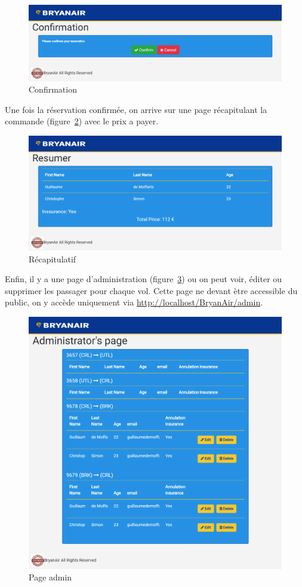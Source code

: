 \documentclass[12pt,a4paper]{article}
\begin{document}
		\begin{figure}
      \includegraphics[width=\textwidth]{Confirmation.png}
			\caption{Confirmation}
			\label{fig:conf}
		\end{figure}
		Une fois la réservation confirmée, on arrive sur une page récapitulant la commande (figure~\ref{fig:recap}) avec le prix a payer.
		\begin{figure}
      \includegraphics[width=\textwidth]{Resumer.png}
			\caption{Récapitulatif}
			\label{fig:recap}
		\end{figure}

		Enfin, il y a une page d'administration (figure~\ref{fig:admin}) ou on peut voir, éditer ou supprimer les passager pour chaque vol. Cette page ne devant ètre accessible du public, on y accède uniquement via \url{http://localhost/BryanAir/admin}.

		\begin{figure}
      \includegraphics[width=\textwidth]{admin.png}
			\caption{Page admin}
			\label{fig:admin}
		\end{figure}
\end{document}
